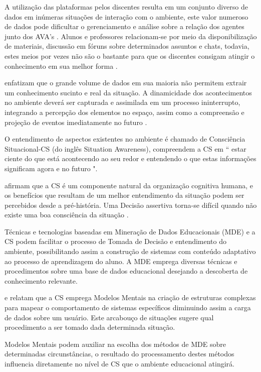 \documentclass[12pt]{article}
\begin{document}
A utilização das plataformas pelos discentes resulta em um conjunto diverso de dados em inúmeras situações de interação com o ambiente, este valor numeroso de dados pode dificultar o gerenciamento e análise sobre a relação dos agentes junto dos AVA's \cite{Rabelo_et_al2017}. Alunos e professores relacionam-se por meio da disponibilização de materiais, discussão em fóruns sobre determinados assuntos e chats, todavia, estes meios por vezes não são o bastante para que os discentes consigam atingir o conhecimento em sua melhor forma \cite{Falci_et_al_2018}. 

\cite{Endsley2012} enfatizam que o grande volume de dados em sua maioria não permitem extrair um conhecimento sucinto e real da situação. A dinamicidade dos acontecimentos no ambiente deverá ser capturada e assimilada em um processo ininterrupto, integrando a percepção dos elementos no espaço, assim como a compreensão e projeção de eventos imediatamente no futuro \cite{Silva_et_al_2012}.

O entendimento de aspectos existentes no ambiente é chamado de Consciência Situacional-CS (do inglês Situation Awareness), \cite[p.13]{Endsley2012} compreendem a CS em `` estar ciente do que está acontecendo ao seu redor e entendendo o que estas informações significam agora e no futuro ". 

\cite{Roy_Breton_Rousseau_2007} afirmam que a CS é um componente natural da organização cognitiva humana, e os benefícios que resultam de um melhor entendimento da situação podem ser percebidos desde a pré-história. Uma Decisão assertiva torna-se difícil quando não existe uma boa consciência da situação \cite{Endsley2012}. 

Técnicas e tecnologias baseadas em Mineração de Dados Educacionais (MDE) e a CS podem facilitar o processo de Tomada de Decisão e entendimento do ambiente, possibilitando assim a construção de sistemas com conteúdo adaptativo ao processo de aprendizagem do aluno. A MDE emprega diversas técnicas e procedimentos sobre uma base de dados educacional desejando a descoberta de conhecimento relevante. 

\cite{Endsley1995} e \cite{Endsley2012}  relatam que a CS emprega Modelos Mentais na criação de estruturas complexas  para mapear o comportamento de sistemas específicos diminuindo assim a carga de dados sobre um usuário. Este arcabouço de situações sugere qual procedimento a ser tomado dada determinada situação. 

Modelos Mentais podem auxiliar na escolha dos métodos de MDE sobre determinadas circunstâncias, o resultado do processamento destes métodos influencia diretamente no nível de CS que o ambiente educacional atingirá. 
\end{document}

